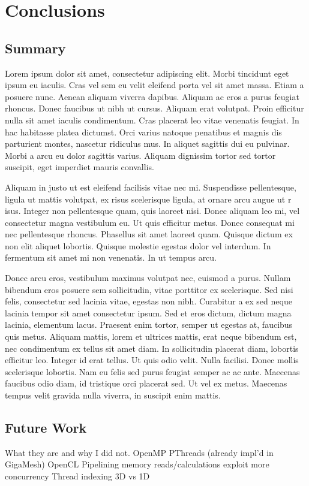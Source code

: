 \chapter{Conclusions}
\section{Summary}
Lorem ipsum dolor sit amet, consectetur adipiscing elit. Morbi tincidunt eget 
ipsum eu iaculis. Cras vel sem eu velit eleifend porta vel sit amet massa. Etiam 
a posuere nunc. Aenean aliquam viverra dapibus. Aliquam ac eros a purus feugiat 
rhoncus. Donec faucibus ut nibh ut cursus. Aliquam erat volutpat. Proin efficitur 
nulla sit amet iaculis condimentum. Cras placerat leo vitae venenatis feugiat. In 
hac habitasse platea dictumst. Orci varius natoque penatibus et magnis dis 
parturient montes, nascetur ridiculus mus. In aliquet sagittis dui eu pulvinar. 
Morbi a arcu eu dolor sagittis varius. Aliquam dignissim tortor sed tortor 
suscipit, eget imperdiet mauris convallis.

Aliquam in justo ut est eleifend facilisis vitae nec mi. Suspendisse pellentesque, 
ligula ut mattis volutpat, ex risus scelerisque ligula, at ornare arcu augue ut r
isus. Integer non pellentesque quam, quis laoreet nisi. Donec aliquam leo mi, vel 
consectetur magna vestibulum eu. Ut quis efficitur metus. Donec consequat mi nec 
pellentesque rhoncus. Phasellus sit amet laoreet quam. Quisque dictum ex non elit 
aliquet lobortis. Quisque molestie egestas dolor vel interdum. In fermentum sit 
amet mi non venenatis. In ut tempus arcu.

Donec arcu eros, vestibulum maximus volutpat nec, euismod a purus. Nullam bibendum 
eros posuere sem sollicitudin, vitae porttitor ex scelerisque. Sed nisi felis, 
consectetur sed lacinia vitae, egestas non nibh. Curabitur a ex sed neque lacinia 
tempor sit amet consectetur ipsum. Sed et eros dictum, dictum magna lacinia, 
elementum lacus. Praesent enim tortor, semper ut egestas at, faucibus quis metus. 
Aliquam mattis, lorem et ultrices mattis, erat neque bibendum est, nec condimentum 
ex tellus sit amet diam. In sollicitudin placerat diam, lobortis efficitur leo. 
Integer id erat tellus. Ut quis odio velit. Nulla facilisi. Donec mollis 
scelerisque lobortis. Nam eu felis sed purus feugiat semper ac ac ante. Maecenas 
faucibus odio diam, id tristique orci placerat sed. Ut vel ex metus. Maecenas 
tempus velit gravida nulla viverra, in suscipit enim mattis.


\section{Future Work}
What they are and why I did not.
OpenMP
PThreads
(already impl’d in GigaMesh)
OpenCL
Pipelining memory reads/calculations exploit more concurrency
Thread indexing 3D vs 1D
